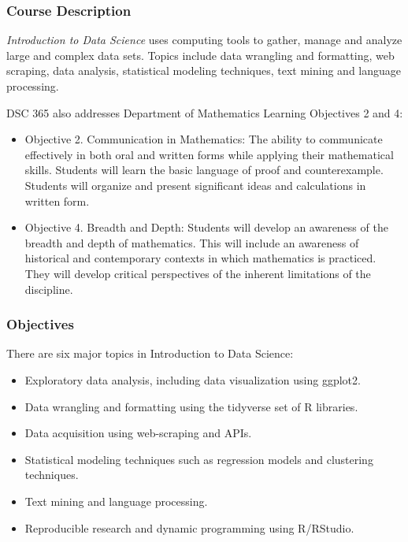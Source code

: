 \documentclass[
  11pt,
  letterpaper,
  DIV=11,
  numbers=noendperiod]{scrartcl}
\providecommand{\tightlist}{%
  \setlength{\itemsep}{0pt}\setlength{\parskip}{0pt}}\usepackage{longtable,booktabs,array}
\begin{document}
\subsubsection{Course Description}\label{course-description}

\emph{Introduction to Data Science} uses computing tools to gather,
manage and analyze large and complex data sets. Topics include data
wrangling and formatting, web scraping, data analysis, statistical
modeling techniques, text mining and language processing.

DSC 365 also addresses Department of Mathematics Learning Objectives 2
and 4:

\begin{itemize}
\tightlist
\item
  Objective 2. Communication in Mathematics: The ability to communicate
  effectively in both oral and written forms while applying their
  mathematical skills. Students will learn the basic language of proof
  and counterexample. Students will organize and present significant
  ideas and calculations in written form.
\item
  Objective 4. Breadth and Depth: Students will develop an awareness of
  the breadth and depth of mathematics. This will include an awareness
  of historical and contemporary contexts in which mathematics is
  practiced. They will develop critical perspectives of the inherent
  limitations of the discipline.
\end{itemize}

\subsubsection{Objectives}\label{objectives}

There are six major topics in Introduction to Data Science:

\begin{itemize}
\tightlist
\item
  Exploratory data analysis, including data visualization using ggplot2.
\item
  Data wrangling and formatting using the tidyverse set of R libraries.
\item
  Data acquisition using web-scraping and APIs.
\item
  Statistical modeling techniques such as regression models and
  clustering techniques.
\item
  Text mining and language processing.
\item
  Reproducible research and dynamic programming using R/RStudio.
\end{itemize}
\end{document}

